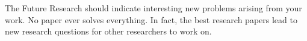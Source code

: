 \documentclass[11pt]{article}       %
\begin{document}
The Future Research should indicate interesting new problems arising from your work. No paper ever solves everything. In fact, the best research papers lead to new research questions for other researchers to work on.




\end{document}

